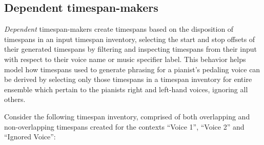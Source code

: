 \subsection{Dependent timespan-makers} %
\label{ssec:dependent-timespan-makers}

\emph{Dependent} timespan-makers create timespans based on the disposition of
timespans in an input timespan inventory, selecting the start and stop offsets
of their generated timespans by filtering and inspecting timespans from their
input with respect to their voice name or music specifier label. This behavior
helps model how timespans used to generate phrasing for a pianist's pedaling
voice can be derived by selecting only those timespans in a timespan inventory
for entire ensemble which pertain to the pianists right and left-hand voices,
ignoring all others.

Consider the following timespan inventory, comprised of both overlapping and
non-overlapping timespans created for the contexts \enquote{Voice 1},
\enquote{Voice 2} and \enquote{Ignored Voice}:

\begin{comment}
<abjad>
timespan_inventory = timespantools.TimespanInventory([
    consort.PerformedTimespan(0, 10, voice_name='Voice 1'),
    consort.PerformedTimespan(0, 10, voice_name='Voice 2'),
    consort.PerformedTimespan(5, 20, voice_name='Ignored Voice'),
    consort.PerformedTimespan(10, 20, voice_name='Voice 1'),
    consort.PerformedTimespan(15, 35, voice_name='Voice 2'),
    consort.PerformedTimespan(25, 30, voice_name='Voice 1'),
    consort.PerformedTimespan(30, 45, voice_name='Ignored Voice'),
    consort.PerformedTimespan(40, 45, voice_name='Voice 2'),
    consort.PerformedTimespan(45, 75, voice_name='Voice 2'),
    consort.PerformedTimespan(50, 80, voice_name='Ignored Voice'),
    consort.PerformedTimespan(50, 60, voice_name='Voice 1'),
    ])
show(timespan_inventory, key='voice_name')
</abjad>
\end{comment}


